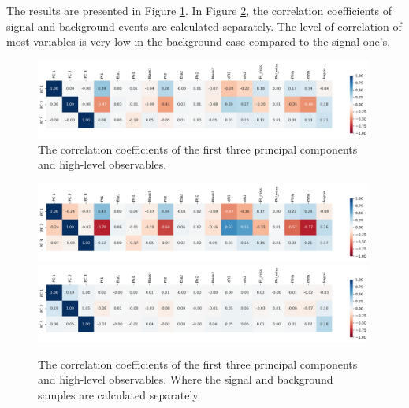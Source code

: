 \documentclass[12pt]{article}
\begin{document}
		The results are presented in Figure \ref{fig:correlation_coefficients_pca}. In Figure \ref{fig:correlation_coefficients_pca-signal-background}, the correlation coefficients of signal and background events are calculated separately. The level of correlation of most variables is very low in the background case compared to the signal one's.
		\begin{figure}[htpb]
			\centering
			\includegraphics[width=0.99\textwidth]{correlation_coefficients_pca.png}
			\caption{The correlation coefficients of the first three principal components and high-level observables.}
			\label{fig:correlation_coefficients_pca}
		\end{figure}
		\begin{figure}[htpb]
			\centering
			\includegraphics[width=0.99\textwidth]{correlation_coefficients_pca-signal.png}
			\includegraphics[width=0.99\textwidth]{correlation_coefficients_pca-background.png}
			\caption{The correlation coefficients of the first three principal components and high-level observables. Where the signal and background samples are calculated separately.}
			\label{fig:correlation_coefficients_pca-signal-background}
		\end{figure}

\end{document}

